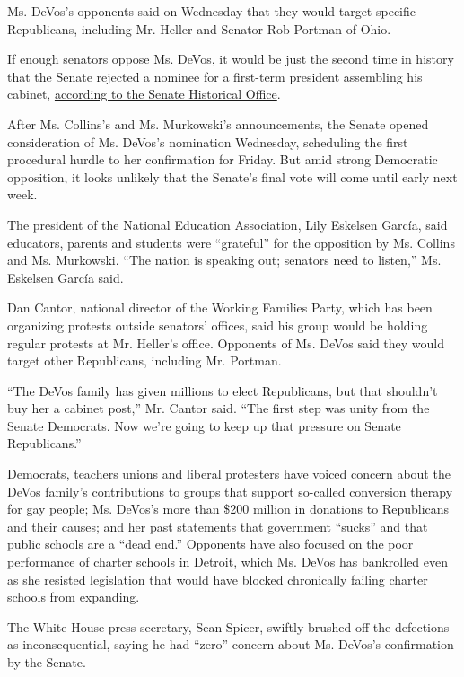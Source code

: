 Ms. DeVos's opponents said on Wednesday that they would target specific
Republicans, including Mr. Heller and Senator Rob Portman of Ohio.

If enough senators oppose Ms. DeVos, it would be just the second time in
history that the Senate rejected a nominee for a first-term president
assembling his cabinet,
\href{https://www.senate.gov/artandhistory/history/common/briefing/Nominations.htm\#10}{according
to the Senate Historical Office}.

After Ms. Collins's and Ms. Murkowski's announcements, the Senate opened
consideration of Ms. DeVos's nomination Wednesday, scheduling the first
procedural hurdle to her confirmation for Friday. But amid strong
Democratic opposition, it looks unlikely that the Senate's final vote
will come until early next week.

The president of the National Education Association, Lily Eskelsen
García, said educators, parents and students were ``grateful'' for the
opposition by Ms. Collins and Ms. Murkowski. ``The nation is speaking
out; senators need to listen,'' Ms. Eskelsen García said.

Dan Cantor, national director of the Working Families Party, which has
been organizing protests outside senators' offices, said his group would
be holding regular protests at Mr. Heller's office. Opponents of Ms.
DeVos said they would target other Republicans, including Mr. Portman.

``The DeVos family has given millions to elect Republicans, but that
shouldn't buy her a cabinet post,'' Mr. Cantor said. ``The first step
was unity from the Senate Democrats. Now we're going to keep up that
pressure on Senate Republicans.''

Democrats, teachers unions and liberal protesters have voiced concern
about the DeVos family's contributions to groups that support so-called
conversion therapy for gay people; Ms. DeVos's more than \$200 million
in donations to Republicans and their causes; and her past statements
that government ``sucks'' and that public schools are a ``dead end.''
Opponents have also focused on the poor performance of charter schools
in Detroit, which Ms. DeVos has bankrolled even as she resisted
legislation that would have blocked chronically failing charter schools
from expanding.

The White House press secretary, Sean Spicer, swiftly brushed off the
defections as inconsequential, saying he had ``zero'' concern about Ms.
DeVos's confirmation by the Senate.

